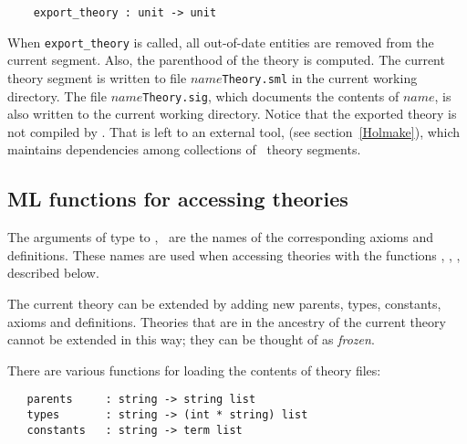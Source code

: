 \begin{boxed}
\begin{verbatim}
    export_theory : unit -> unit
\end{verbatim}\end{boxed}

When {\small\verb+export_theory+} is called, all out-of-date entities
are removed from the current segment. Also, the parenthood of the
theory is computed. The current theory segment is written to file
$name${\small{\tt Theory.sml}} in the current working directory.  The
file $name${\small{\tt Theory.sig}}, which documents the contents of
$name$, is also written to the current working directory.  Notice that
the exported theory is not compiled by \HOL. That is left to an
external tool, \holmake{} (see section~\ref{Holmake}), which maintains
dependencies among collections of \HOL\ theory segments.


\subsection{ML functions for accessing theories}

  The arguments of \ML{} type  to
,  \etc\ are the names of the
corresponding axioms and definitions. These names are used when
accessing theories with the functions , ,
\etc, described below.

The current theory can be extended by adding new parents, types,
constants, axioms and definitions. Theories that are in the ancestry
of the current theory cannot be extended in this way; they can be
thought of as \emph{frozen}.

There are various functions for loading the contents of theory files:

\begin{boxed}
\begin{verbatim}
   parents     : string -> string list
   types       : string -> (int * string) list
   constants   : string -> term list
\end{verbatim}\end{boxed}

